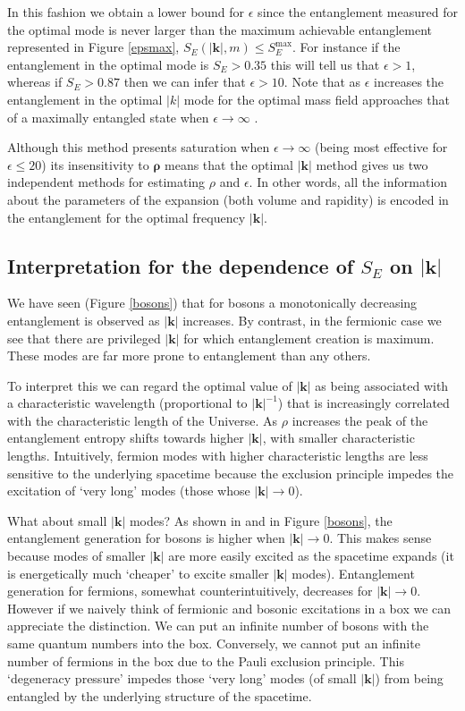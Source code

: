In this fashion we obtain a lower bound for $\epsilon$ since the entanglement measured for the optimal mode is never larger than  the maximum achievable entanglement represented in Figure \ref{epsmax}, $S_E(|\bm k|,m) \le S_E^{\text{max}}$. For  instance if the entanglement in the optimal mode is $S_E>0.35$ this will tell us that $\epsilon>1$, whereas if $S_E>0.87$ then we can infer that $\epsilon>10$. Note that as $\epsilon$ increases the entanglement in the optimal $|k|$ mode for the optimal mass field  approaches that of a maximally entangled state when $\epsilon\rightarrow\infty$ .

Although this method presents saturation when $\epsilon\rightarrow\infty$ (being most  effective for $\epsilon \le 20$) its insensitivity to $\bm{\rho}$   means that the optimal $|\bm k|$ method gives us two independent methods for estimating $\rho$ and $\epsilon$. In other words, all the information about the parameters of the expansion (both volume and rapidity) is encoded in the entanglement for the optimal frequency $|\bm k|$.


\subsection{Interpretation for the dependence of $S_E$ on $|{\bm k}|$}

We have seen (Figure \ref{bosons}) that for bosons a monotonically decreasing entanglement is observed as $|\bm k|$ increases. By contrast, in the fermionic case we see that there are privileged $|\bm k|$ for which entanglement creation is maximum. These modes are far more prone  to entanglement than any others. 

To interpret  this  we can regard the optimal value of $|\bm k|$ as being associated with a characteristic wavelength (proportional to $|\bm k|^{-1}$) that is increasingly  correlated with the characteristic length of the Universe. 
As $\rho$  increases the peak of the entanglement entropy shifts towards higher $|\bm k|$, with smaller characteristic lengths. Intuitively,
 fermion modes with  higher characteristic lengths are less sensitive to the underlying spacetime because the exclusion principle impedes the excitation of `very long' modes (those whose $|\bm k|\rightarrow0$).

What about small $|\bm k|$ modes?
As shown in \cite{caball} and in Figure \ref{bosons},  the entanglement generation for bosons is higher when $|\bm k|\rightarrow0$. This makes sense because modes of smaller $|\bm k|$ are more easily excited as the spacetime expands (it is energetically much `cheaper'  to excite smaller $|\bm k|$ modes).
Entanglement generation for fermions, somewhat counterintuitively, decreases for $|\bm k|\rightarrow 0$.   However if 
we naively think of fermionic and bosonic excitations in a box we can appreciate the distinction. We can put an infinite number of bosons with the same quantum numbers into the box. Conversely, we cannot put an infinite number of fermions in the box due to the Pauli exclusion principle. This `degeneracy pressure'  impedes those `very long' modes (of small $|\bm k|$) from being entangled by the underlying structure of the spacetime.



